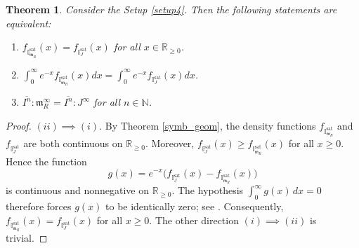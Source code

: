 \documentclass[12pt,a4paper]{amsart}
\theoremstyle{plain}
\newtheorem{theorem}{Theorem}[section]
\theoremstyle{definition}
\numberwithin{equation}{theorem}
\begin{document}
\begin{theorem}\label{sat=symb}
 Consider the Setup \ref{setup4}. Then the following statements are equivalent:
 \begin{enumerate}[$(i)$]
  \item $\displaystyle f_{\mathbb{I}^{\mathrm{sat}}_{\mathfrak{m}_R}}(x) = f_{\mathbb{I}^{\mathrm{sat}}_J}(x)$ for all $x\in\mathbb{R}_{\geq 0}$.
  \item $\displaystyle\int_0^{\infty}e^{-x}f_{\mathbb{I}^{\mathrm{sat}}_{\mathfrak{m}_R}}(x) dx = \int_0^{\infty}e^{-x}f_{\mathbb{I}^{\mathrm{sat}}_J}(x) dx$.
  \item $\overline{I^n} : \mathfrak{m}_R^{\infty} = \overline{I^n} : J^{\infty}$ for all $n\in\mathbb{N}$.
 \end{enumerate}
\end{theorem}
\begin{proof}
$(ii) \implies (i)$. By Theorem \ref{symb_geom}, the density functions $f_{\mathbb{I}^{\mathrm{sat}}_{\mathfrak{m}_R}}$ and $f_{\mathbb{I}^{\mathrm{sat}}_{J}}$ are both continuous on $\mathbb{R}_{\geq 0}$. Moreover, $f_{\mathbb{I}^{\mathrm{sat}}_{J}}(x) \geq f_{\mathbb{I}^{\mathrm{sat}}_{\mathfrak{m}_R}}(x)$ for all $x\geq 0$. Hence the function
\[
g(x) = e^{-x}\bigl(f_{\mathbb{I}^{\mathrm{sat}}_{J}}(x) - f_{\mathbb{I}^{\mathrm{sat}}_{\mathfrak{m}_R}}(x)\bigr)
\] is continuous and nonnegative on $\mathbb{R}_{\ge 0}$. The hypothesis $\int_0^{\infty} g(x)\,dx = 0$
therefore forces $g(x)$ to be identically zero; see \cite[Exercise 6.2]{Rud76}. Consequently,
$f_{\mathbb{I}^{\mathrm{sat}}_{\mathfrak{m}_R}}(x) = f_{\mathbb{I}^{\mathrm{sat}}_{J}}(x)$ for all $x \geq 0$. The other direction $(i) \implies (ii)$ is trivial.


\end{proof}
\end{document}
